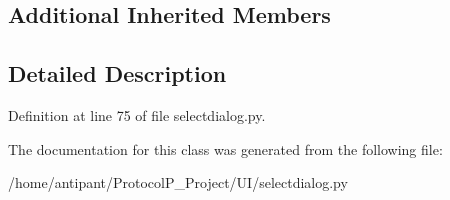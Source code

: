 \subsection*{Additional Inherited Members}


\subsection{Detailed Description}


Definition at line 75 of file selectdialog.\-py.



The documentation for this class was generated from the following file\-:\begin{DoxyCompactItemize}
\item 
/home/antipant/\-Protocol\-P\-\_\-\-Project/\-U\-I/selectdialog.\-py\end{DoxyCompactItemize}

